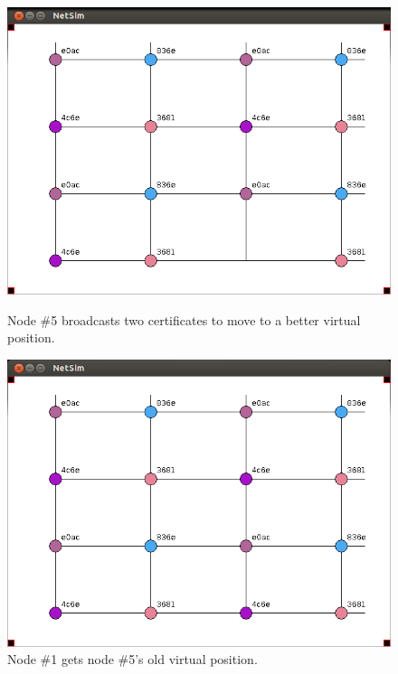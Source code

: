 \documentclass[ %
                    author={Luke Murray},
                supervisor={Dr. Simon Hollis},
                     title={Shadow Peer-to-Peer Networks},
                  subtitle={},
                    degree={MEng},
                      year={2013} ]{thesis}
\begin{document}
\begin{figure}[h]
    \centering
    \begin{minipage}[b]{0.45\linewidth}
        \centering
        \includegraphics[width=\linewidth]{sim_pics/balance_8.png}
        \caption{Node \#5 broadcasts two certificates to move to a better virtual position.}
        \label{sim_balance5}
    \end{minipage}
    \hspace{0.5cm}
    \begin{minipage}[b]{0.45\linewidth}
        \centering
        \includegraphics[width=\linewidth]{sim_pics/balance_9.png}
        \caption{Node \#1 gets node \#5's old virtual position.}
        \label{sim_balance6}
    \end{minipage}
\end{figure}
\end{document}
